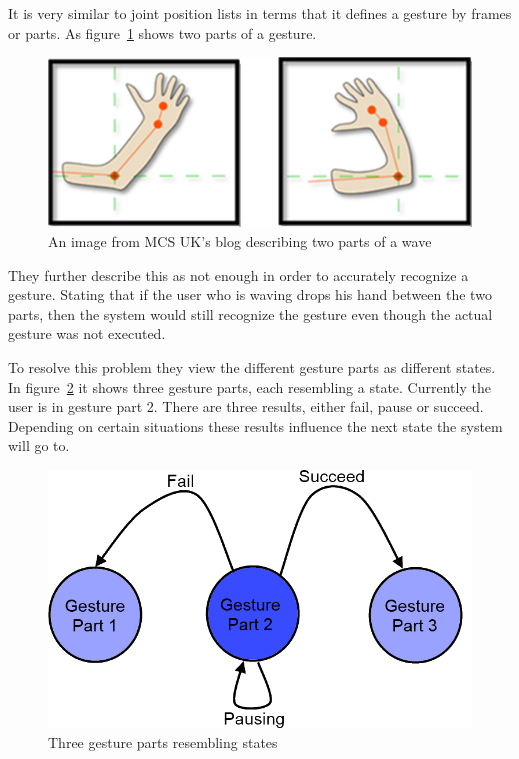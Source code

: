 It is very similar to joint position lists in terms that it defines a gesture by frames or parts. As figure~\ref{wave} shows two parts of a gesture.

\begin{figure}[!htbp]
\centering
\includegraphics[width=1\textwidth]{images/wave.png}
\caption{An image from MCS UK's blog describing two parts of a wave}
\label{wave}
\end{figure}
 
They further describe this as not enough in order to accurately recognize a gesture. Stating that if the user who is waving drops his hand between the two parts, then the system would still recognize the gesture even though the actual gesture was not executed.

To resolve this problem they view the different gesture parts as different states. In figure~\ref{gesturestates} it shows three gesture parts, each resembling a state. Currently the user is in gesture part 2. There are three results, either fail, pause or succeed. Depending on certain situations these results influence the next state the system will go to.

\begin{figure}[!htbp]
\centering
\includegraphics[width=1\textwidth]{images/gesturestate.png}
\caption{Three gesture parts resembling states}
\label{gesturestates}
\end{figure}

